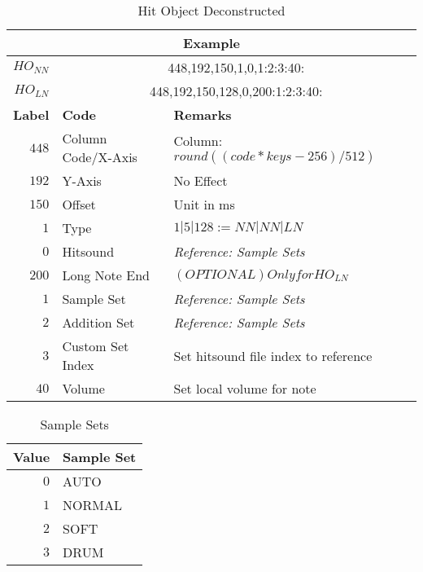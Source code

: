 \begin{table}[ht]
	\begin{center}
    \caption{Hit Object Deconstructed}
    \label{tab:tbl_ho_dec}
    \begin{tabular}{r|l|l}
		\multicolumn{3}{c}{\textbf{Example}} \\
		\hline
		\textbf{$HO_{NN}$} & \multicolumn{2}{c}{448,192,150,1,0,1:2:3:40:} \\
		\textbf{$HO_{LN}$} & \multicolumn{2}{c}{448,192,150,128,0,200:1:2:3:40:} \\
		\hline
		\textbf{Label} & \textbf{Code} & \textbf{Remarks}\\
		\hline
		$ 448 $ & Column Code/X-Axis & Column: $round((code * keys - 256) / 512)$\\
		$ 192 $ & Y-Axis             & No Effect\\
		$ 150 $ & Offset             & Unit in ms\\
		$ 1 $   & Type               & $1|5|128 := NN|NN|LN$\\
		\hline
		$ 0 $   & Hitsound           & \textit{Reference: Sample Sets}\\
		$ 200 $ & Long Note End      & $ (OPTIONAL) Only for HO_{LN} $ \\
		$ 1 $   & Sample Set         & \textit{Reference: Sample Sets} \\	
		$ 2 $   & Addition Set       & \textit{Reference: Sample Sets} \\	
		$ 3 $   & Custom Set Index   & Set hitsound file index to reference\\
		$ 40 $  & Volume             & Set local volume for note\\		
	\end{tabular}
	\end{center}
\end{table}

\begin{table}[ht]
	\begin{center}
    \caption{Sample Sets}
    \label{tab:tbl_samplesets}
    \begin{tabular}{r|l}
		\textbf{Value} & \textbf{Sample Set} \\
		\hline
		$ 0 $ & AUTO \\
		$ 1 $ & NORMAL \\
		$ 2 $ & SOFT \\
		$ 3 $ & DRUM \\               
	\end{tabular}
	\end{center}
\end{table}